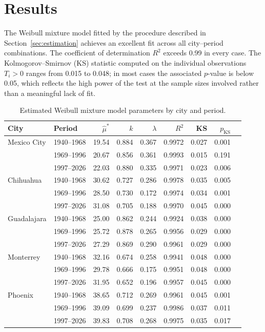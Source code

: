 \documentclass[APA,STIX1COL]{WileyNJD-v2}
\begin{document}
\section{Results}\label{sec:results}

The Weibull mixture model fitted by the procedure described in
Section~\ref{sec:estimation} achieves an excellent fit across
all city--period combinations. The coefficient of determination
$R^2$ exceeds 0.99 in every case. The Kolmogorov--Smirnov (KS)
statistic computed on the individual observations $T_i>0$ ranges
from 0.015 to 0.048; in most cases the associated $p$-value is
below 0.05, which reflects the high power of the test at the
sample sizes involved rather than a meaningful lack of fit.

\begin{table}[ht]
\centering
\begin{tabular}{llrrrrrrr}
\toprule
City & Period & $\hat{\mu}^*$ & $k$ & $\lambda$ & $R^2$ & KS & $p_{\mathrm{KS}}$ \\
\midrule
Mexico City & 1940--1968 & 19.54 & 0.884 & 0.367 & 0.9972 & 0.027 & 0.001 \\
            & 1969--1996 & 20.67 & 0.856 & 0.361 & 0.9993 & 0.015 & 0.191 \\
            & 1997--2026 & 22.03 & 0.880 & 0.335 & 0.9971 & 0.023 & 0.006 \\
\midrule
Chihuahua   & 1940--1968 & 30.62 & 0.727 & 0.286 & 0.9978 & 0.035 & 0.005 \\
            & 1969--1996 & 28.50 & 0.730 & 0.172 & 0.9974 & 0.034 & 0.001 \\
            & 1997--2026 & 31.08 & 0.705 & 0.188 & 0.9970 & 0.045 & 0.000 \\
\midrule
Guadalajara & 1940--1968 & 25.00 & 0.862 & 0.244 & 0.9924 & 0.038 & 0.000 \\
            & 1969--1996 & 25.72 & 0.878 & 0.265 & 0.9956 & 0.029 & 0.000 \\
            & 1997--2026 & 27.29 & 0.869 & 0.290 & 0.9961 & 0.029 & 0.000 \\
\midrule
Monterrey   & 1940--1968 & 32.16 & 0.674 & 0.258 & 0.9941 & 0.048 & 0.000 \\
            & 1969--1996 & 29.78 & 0.666 & 0.175 & 0.9951 & 0.048 & 0.000 \\
            & 1997--2026 & 31.95 & 0.652 & 0.196 & 0.9957 & 0.045 & 0.000 \\
\midrule
Phoenix     & 1940--1968 & 38.65 & 0.712 & 0.269 & 0.9961 & 0.045 & 0.001 \\
            & 1969--1996 & 39.09 & 0.699 & 0.237 & 0.9986 & 0.037 & 0.011 \\
            & 1997--2026 & 39.83 & 0.708 & 0.268 & 0.9975 & 0.035 & 0.017 \\
\bottomrule
\end{tabular}
\caption{Estimated Weibull mixture model parameters by city and period.}
\label{tab:parametros}
\end{table}
\end{document}
